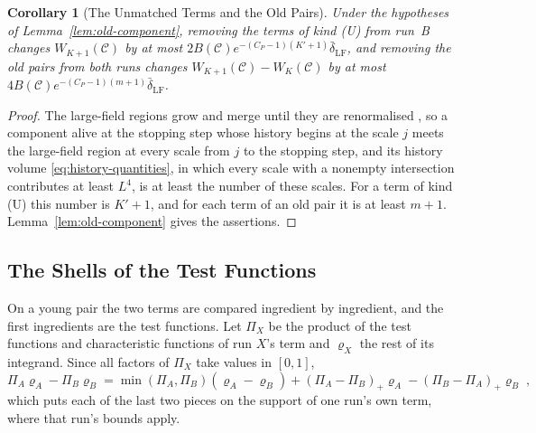 \documentclass[11pt]{preprint}
\numberwithin{equation}{section}
\newtheorem{corollary}[theorem]{Corollary}
\theoremstyle{definition}
\theoremstyle{remark}
\theoremstyle{plain}
\begin{document}
\begin{corollary}[The Unmatched Terms and the Old Pairs]\label{cor:unmatched-old}
Under the hypotheses of Lemma~\ref{lem:old-component}, removing the terms of kind (U) from run~B changes $W_{K+1}(\mathcal C)$ by at most $2B(\mathcal C)e^{-(C_P-1)(K'+1)}\bar\delta_{\mathrm{LF}}$, and removing the old pairs from both runs changes $W_{K+1}(\mathcal C) - W_K(\mathcal C)$ by at most $4B(\mathcal C)e^{-(C_P-1)(m+1)}\bar\delta_{\mathrm{LF}}$.
\end{corollary}

\begin{proof}
The large-field regions grow and merge until they are renormalised \cite[(0.3), p.~176]{BalabanLFR1}, so a component alive at the stopping step whose history begins at the scale $j$ meets the large-field region at every scale from $j$ to the stopping step, and its history volume \eqref{eq:history-quantities}, in which every scale with a nonempty intersection contributes at least $L^4$, is at least the number of these scales. For a term of kind (U) this number is $K' + 1$, and for each term of an old pair it is at least $m + 1$. Lemma~\ref{lem:old-component} gives the assertions.
\end{proof}

\subsection{The Shells of the Test Functions}\label{sec:shells}

On a young pair the two terms are compared ingredient by ingredient, and the first ingredients are the test functions. Let $\Pi_X$ be the product of the test functions and characteristic functions of run $X$'s term and $\varrho_X$ the rest of its integrand. Since all factors of $\Pi_X$ take values in $[0, 1]$,
\begin{equation}\label{eq:three-piece}
    \Pi_A\varrho_A - \Pi_B\varrho_B = \min(\Pi_A, \Pi_B)(\varrho_A - \varrho_B) + (\Pi_A - \Pi_B)_+\varrho_A - (\Pi_B - \Pi_A)_+\varrho_B\;,
\end{equation}
which puts each of the last two pieces on the support of one run's own term, where that run's bounds apply.
\end{document}
